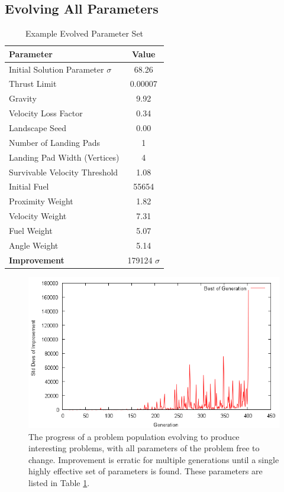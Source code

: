 \documentclass[conference]{IEEEtran}
\begin{document}
\subsection{Evolving All Parameters}

\begin{table}[ht]
\caption{Example Evolved Parameter Set}
\label{tab:example}
\begin{tabular}{l | c}
\hline
Parameter & Value \\
\hline
Initial Solution Parameter $\sigma$	& 68.26 \\
Thrust Limit & 0.00007 \\
Gravity	 & 9.92 \\
Velocity Loss Factor & 0.34 \\
Landscape Seed & 0.00 \\
Number of Landing Pads	& 1 \\
Landing Pad Width (Vertices)	& 4	 \\
Survivable Velocity Threshold	& 1.08 \\
Initial Fuel	& 55654 \\
Proximity Weight & 1.82 \\
Velocity Weight & 7.31 \\
Fuel Weight & 5.07 \\
Angle Weight & 5.14 \\
\hline
{\bf Improvement} & {179124 $\sigma$} \\
\hline
\end{tabular}	
\end{table}

\begin{figure}[hbtp]
\centering
\includegraphics[scale=0.4]{img/graph_evoproblems}
\caption{The progress of a problem population evolving to produce interesting problems, with all parameters of the problem free to change. Improvement is erratic for multiple generations until a single highly effective set of parameters is found. These parameters are listed in Table \ref{tab:example}.}
\label{fig:graph_evoproblems}
\end{figure}
\end{document}
